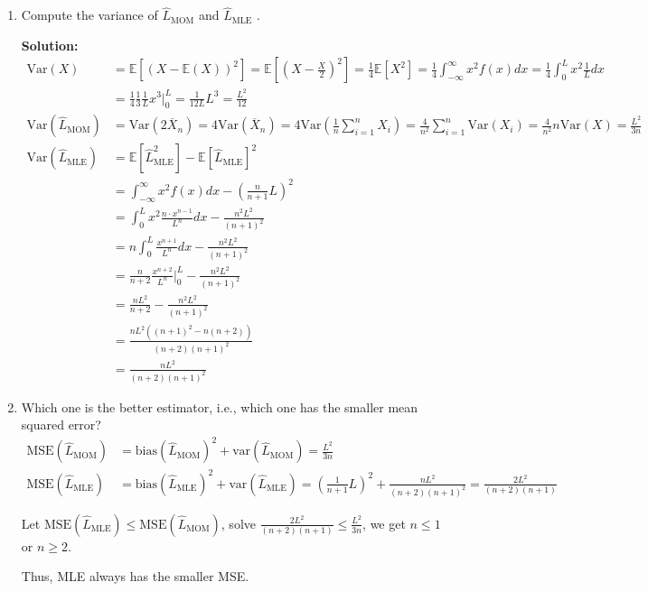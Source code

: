\documentclass[letter, 12pt]{article}
\begin{document}
\begin{enumerate}[wide = 0pt, label = \arabic*)]
		\item {Compute the variance of $ \hat{L}_{\text{MOM}} $ and $ \hat{L}_{\text{MLE}} $ .}
		\par{\textbf{Solution:}}
		\begin{align*}
			\text{Var}({X}) &= \mathbb{E}[(X - \mathbb{E}(X))^2] = \mathbb{E}[(X - \frac{X}{2})^2] = \frac{1}{4} \mathbb{E}[X^2] = \frac{1}{4} \int_{-\infty}^{\infty} x^2 f(x) dx = \frac{1}{4} \int_{0}^{L} x^2 \frac{1}{L} dx \\
			&= \frac{1}{4} \frac{1}{3} \frac{1}{L} x^3 \Big|_0^L = \frac{1}{12 L} L^3 = \frac{L^2}{12}\\
			\text{Var}(\hat{L}_{\text{MOM}}) &= \text{Var}(2 \overline{X}_n) = 4 \text{Var}(\overline{X}_n) = 4 \text{Var}(\frac{1}{n}\sum_{i=1}^{n} {X}_i) = \frac{4}{n^2} \sum_{i=1}^{n} \text{Var}({X}_i) = \frac{4}{n^2} n \text{Var}({X}) = \frac{L^2}{3 n} \\
			\text{Var}(\hat{L}_{\text{MLE}}) &= \mathbb{E}[\hat{L}_{\text{MLE}}^2] - \mathbb{E}[\hat{L}_{\text{MLE}}]^2 \\
			&= \int_{-\infty}^{\infty} x^2 f(x) dx - (\frac{n}{n+1}L)^2 \\
			&= \int_{0}^{L} x^2 \frac{n \cdot x^{n-1}}{L^n} dx - \frac{n^2 L^2}{(n+1)^2} \\
			&= n \int_{0}^{L} \frac{x^{n+1}}{L^n} dx - \frac{n^2 L^2}{(n+1)^2} \\
			&= \frac{n}{n+2} \frac{x^{n+2}}{L^n} \Big|_{0}^L - \frac{n^2 L^2}{(n+1)^2} \\
			&= \frac{n L^2}{n+2} - \frac{n^2 L^2}{(n+1)^2} \\
			&= \frac{n L^2 ((n+1)^2 - n(n+2))}{(n+2)(n+1)^2} \\
			&= \frac{n L^2}{(n+2)(n+1)^2}
		\end{align*}
		
		\item {Which one is the better estimator, i.e., which one has the smaller mean squared error?}
		\begin{align*}
			\text{MSE}(\hat{L}_{\text{MOM}}) &= \text{bias}(\hat{L}_{\text{MOM}})^2 + \text{var}(\hat{L}_{\text{MOM}}) = \frac{L^2}{3 n} \\
			\text{MSE}(\hat{L}_{\text{MLE}}) &= \text{bias}(\hat{L}_{\text{MLE}})^2 + \text{var}(\hat{L}_{\text{MLE}}) = (\frac{1}{n+1} L)^2 + \frac{n L^2}{(n+2)(n+1)^2} = \frac{2 L^2}{(n+2)(n+1)} 
		\end{align*}
		\par{Let $ \text{MSE}(\hat{L}_{\text{MLE}}) \le \text{MSE}(\hat{L}_{\text{MOM}}) $, solve $ \frac{2 L^2}{(n+2)(n+1)} \le \frac{L^2}{3 n} $, we get $ n \le 1 $ or $ n \ge 2 $.}
		\par{Thus, MLE always has the smaller MSE.}
		

\end{enumerate}
\end{document}
